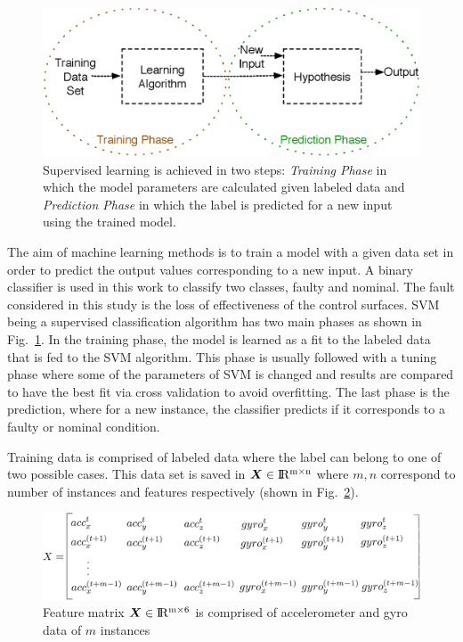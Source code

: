 \begin{figure}
\begin{center}
\includegraphics[width=12cm]{figures/supervisedLearningBasics}    %
\caption{Supervised learning is achieved in two steps: \emph{Training Phase} in which the model parameters are calculated given labeled data and \emph{Prediction Phase} in which the label is predicted for a new input using the trained model.} 
\label{fig:supervisedLearning}
\end{center}
\end{figure}

The aim of machine learning methods is to train a model with a given data set in order to predict the output values corresponding to a new input.
A binary classifier is used in this work to classify two classes, faulty and nominal. 
The fault considered in this study is the loss of effectiveness of the control surfaces. 
SVM being a supervised classification algorithm has two main phases as shown in Fig.~\ref{fig:supervisedLearning}. 
In the training phase, the model is learned as a fit to the labeled data that is fed to the SVM algorithm. 
This phase is usually followed with a tuning phase where some of the parameters of SVM is changed and results are compared to have the best fit via cross validation to avoid overfitting. 
The last phase is the prediction, where for a new instance, the classifier predicts if it corresponds to a faulty or nominal condition.

Training data is comprised of labeled data where the label can belong to one of two possible cases. 
This data set is saved in $\bm{X} \in {\rm I\!R^{m \times n}}  $ where $m,n$ correspond to number of instances and features respectively (shown in Fig.~\ref{fig:featureMatrix}). 

\begin{figure}[h]
\begin{center}
\includegraphics[width=13cm]{figures/featureMatrix}    %
\caption{Feature matrix $\bm{X} \in {\rm I\!R^{m \times 6}}  $  is comprised of accelerometer and gyro data of $m$ instances} 
\label{fig:featureMatrix}
\end{center}
\end{figure}

